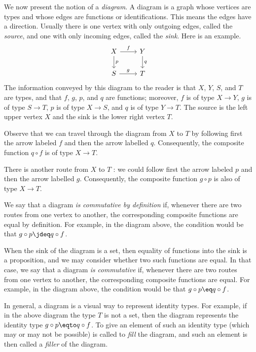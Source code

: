 \begin{remark}\label{rem:diagram}
We now present the notion of a \emph{diagram}. A diagram is a graph
whose vertices are types and whose edges are functions or identifications. 
This means the edges have a direction. Usually there
is one vertex with only outgoing edges, called the \emph{source},
and one with only incoming edges, called the \emph{sink}. 
Here is an example.
\[
\begin{tikzcd}
  X \ar[r,"f"] \ar[d,"p"] & Y \ar[d,"q"] \\
  S \ar[r,"g"]            & T
\end{tikzcd}
\]
The information conveyed by this diagram to the reader is that $X$, $Y$, $S$, and $T$ are types, and that $f$, $g$, $p$, and $q$
are functions; moreover, $f$ is of type $X \to Y$, $g$ is of type $S \to T$, $p$ is of type $X \to S$, and $q$ is of type $Y \to T$. The source is the left upper vertex $X$ and
the sink is the lower right vertex $T$. 

Observe that we can travel through the diagram from $X$ to $T$ by following first the arrow labeled $f$ and then the arrow labelled $q$.
Consequently, the composite function $q \circ f$ is of type $X \to T$.

There is another route from $X$ to $T$ : we could follow first the arrow labeled $p$ and then the arrow labelled $g$.
Consequently, the composite function $g \circ p$ is also of type $X \to T$.

We say that a diagram \emph{is commutative by definition} if, whenever there are two routes from one
vertex to another, the corresponding composite functions are equal by definition.  For example, in the diagram above, the condition would be that
$g \circ p \jdeq q \circ f$.

When the sink of the diagram is a set, then equality of functions into the sink is a 
proposition, and we may consider whether two such functions are equal.  In that case, we say that a diagram \emph{is commutative} if,
whenever there are two routes from one vertex to another, the corresponding composite functions are equal.  For example, in the diagram above,
the condition would be that $g \circ p \eq q \circ f$.

In general, a diagram is a visual way to represent identity types.
For example, if in the above diagram the type $T$ is not
a set, then the diagram represents the identity type
$g \circ p \eqto q \circ f$. To give an element of such an identity type
(which may or may not be possible) is called to \emph{fill} the diagram,
and such an element is then called a \emph{filler} of the diagram.



\end{remark}
